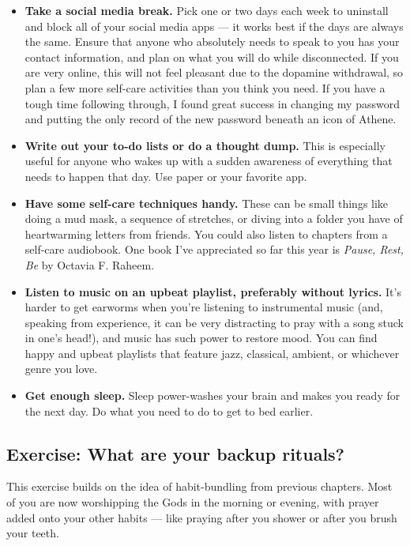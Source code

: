 \documentclass[
]{book}
\providecommand{\tightlist}{%
  \setlength{\itemsep}{0pt}\setlength{\parskip}{0pt}}
\begin{document}
\begin{itemize}
\tightlist
\item
  \textbf{Take a social media break.} Pick one or two days each week to uninstall and block all of your social media apps --- it works best if the days are always the same. Ensure that anyone who absolutely needs to speak to you has your contact information, and plan on what you will do while disconnected. If you are very online, this will not feel pleasant due to the dopamine withdrawal, so plan a few more self-care activities than you think you need. If you have a tough time following through, I found great success in changing my password and putting the only record of the new password beneath an icon of Athene.
\item
  \textbf{Write out your to-do lists or do a thought dump.} This is especially useful for anyone who wakes up with a sudden awareness of everything that needs to happen that day. Use paper or your favorite app.
\item
  \textbf{Have some self-care techniques handy.} These can be small things like doing a mud mask, a sequence of stretches, or diving into a folder you have of heartwarming letters from friends. You could also listen to chapters from a self-care audiobook. One book I've appreciated so far this year is \emph{Pause, Rest, Be} by Octavia F. Raheem.
\item
  \textbf{Listen to music on an upbeat playlist, preferably without lyrics.} It's harder to get earworms when you're listening to instrumental music (and, speaking from experience, it can be very distracting to pray with a song stuck in one's head!), and music has such power to restore mood. You can find happy and upbeat playlists that feature jazz, classical, ambient, or whichever genre you love.
\item
  \textbf{Get enough sleep.} Sleep power-washes your brain and makes you ready for the next day. Do what you need to do to get to bed earlier.
\end{itemize}

\hypertarget{exercise-what-are-your-backup-rituals}{%
\subsection{Exercise: What are your backup rituals?}\label{exercise-what-are-your-backup-rituals}}

This exercise builds on the idea of habit-bundling from previous chapters. Most of you are now worshipping the Gods in the morning or evening, with prayer added onto your other habits --- like praying after you shower or after you brush your teeth.
\end{document}
